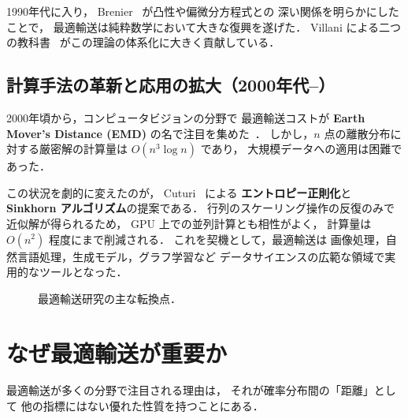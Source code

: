 1990年代に入り，
Brenier~\cite{Brenier1991} が凸性や偏微分方程式との
深い関係を明らかにしたことで，
最適輸送は純粋数学において大きな復興を遂げた．
Villani による二つの教科書~\cite{Villani2003, Villani2009}
がこの理論の体系化に大きく貢献している．

\subsection*{計算手法の革新と応用の拡大（2000年代--）}

2000年頃から，コンピュータビジョンの分野で
最適輸送コストが \textbf{Earth Mover's Distance (EMD)}
の名で注目を集めた~\cite{Rubner2000}．
しかし，$n$ 点の離散分布に対する厳密解の計算量は $O(n^3 \log n)$ であり，
大規模データへの適用は困難であった．

この状況を劇的に変えたのが，
Cuturi~\cite{Cuturi2013} による
\textbf{エントロピー正則化}と \textbf{Sinkhorn アルゴリズム}の提案である．
行列のスケーリング操作の反復のみで近似解が得られるため，
GPU 上での並列計算とも相性がよく，
計算量は $O(n^2)$ 程度にまで削減される．
これを契機として，最適輸送は
画像処理，自然言語処理，生成モデル，グラフ学習など
データサイエンスの広範な領域で実用的なツールとなった．

\begin{figure}[htbp]
\centering
{}
\caption{最適輸送研究の主な転換点．}
\label{fig:timeline}
\end{figure}


\section{なぜ最適輸送が重要か}\label{sec:why-ot}

最適輸送が多くの分野で注目される理由は，
それが確率分布間の「距離」として
他の指標にはない優れた性質を持つことにある．

